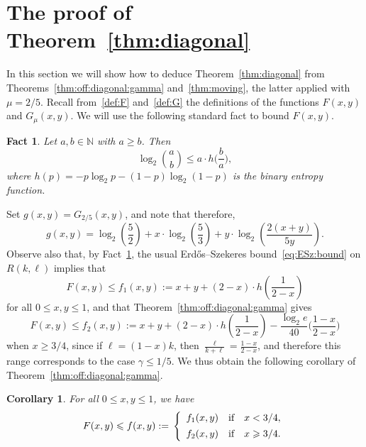 \documentclass[12pt,reqno]{amsart}
\newtheorem{corollary}[theorem]{Corollary}
\newtheorem{fact}[theorem]{Fact}
\theoremstyle{definition}
\theoremstyle{remark}
\newcommand\N{\mathbb{N}}
\renewcommand{\le}{\leqslant}
\renewcommand{\ge}{\geqslant}
\def\N{\mathbb{N}}
\begin{document}
\pagebreak

\section{The proof of Theorem~\ref{thm:diagonal}}\label{diagonal:sec}

In this section we will show how to deduce Theorem~\ref{thm:diagonal} from Theorems~\ref{thm:off:diagonal:gamma} and~\ref{thm:moving}, the latter applied with $\mu = 2/5$. Recall from~\eqref{def:F} and~\eqref{def:G} the definitions of the functions $F(x,y)$ and $G_\mu(x,y)$. We will use the following standard fact to bound $F(x,y)$. %

\begin{fact}\label{fact:entropy}
Let $a,b \in \N$ with $a \ge b$. Then
$$\log_2 {a \choose b} \le a \cdot h\bigg( \frac{b}{a} \bigg),$$
where $h(p) = - p \log_2 p - (1 - p) \log_2(1 - p)$ is the binary entropy function.
\end{fact}

Set $g(x,y) = G_{2/5}(x,y)$, and note that therefore, %
$$g(x,y) = \log_2 \left( \frac{5}{2} \right) + x \cdot \log_2 \left(\frac{5}{3} \right) + y \cdot \log_2 \left(\frac{2(x+y)}{5y}\right).$$ 
Observe also that, by Fact~\ref{fact:entropy}, the usual Erd\H{o}s--Szekeres bound~\eqref{eq:ESz:bound} on $R(k,\ell)$ implies that
\begin{equation}\label{eq:F:ESz:bound}
F(x,y) \le f_1(x,y) := x + y + (2 - x) \cdot h\left(\frac{1}{2-x}\right)
\end{equation}
for all $0 \le x,y \le 1$, 
and that Theorem~\ref{thm:off:diagonal:gamma} gives
\begin{equation}\label{eq:F:our:bound}
F(x,y) \le f_2(x,y) := x + y + (2 - x) \cdot h\left(\frac{1}{2-x}\right) - \frac{\log_2 e}{40} \bigg( \frac{1-x}{2-x} \bigg)
\end{equation} 
when $x \ge 3/4$, %
since if $\ell = (1-x)k$, then $\frac{\ell}{k+\ell} = \frac{1-x}{2-x}$, and therefore this range corresponds to the case $\gamma \le 1/5$. We thus obtain the following corollary of Theorem~\ref{thm:off:diagonal:gamma}. 

\begin{corollary}\label{cor:bounding:F}
For all\/ $0 \le x,y \le 1$, we have
$$F(x,y) \le f(x,y) :=\, \left\{
    \begin{array} {c@{\quad \textup{if} \quad}l}
      f_1(x,y) & x < 3/4, \\[+1ex]
      f_2(x,y) & x \ge 3/4.
    \end{array}\right.
$$
\end{corollary}
\end{document}
